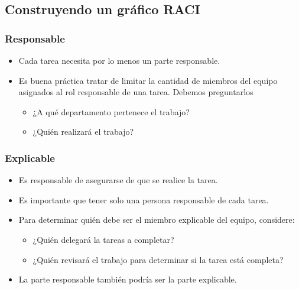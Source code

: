 \documentclass[10pt]{book}
\begin{document}
	\subsection{Construyendo un gráfico RACI}

	    \subsubsection{Responsable}

	    \begin{itemize}
		\item Cada tarea necesita por lo menos un parte responsable.
		\item Es buena práctica tratar de limitar la cantidad de miembros del equipo asignados al rol responsable de una tarea. Debemos preguntarlos 
		\begin{itemize}
		    \item ¿A qué departamento pertenece el trabajo?
		    \item ¿Quién realizará el trabajo?
		\end{itemize}
	    \end{itemize}
	
	    \subsubsection{Explicable}
	    \begin{itemize}
		\item Es responsable de asegurarse de que se realice la tarea.
		\item Es importante que tener solo una persona responsable de cada tarea.
		\item Para determinar quién debe ser el miembro explicable del equipo, considere:
		\begin{itemize}
		    \item ¿Quién delegará la tareas a completar?
		    \item ¿Quién revisará el trabajo para determinar si la tarea está completa?
		\end{itemize}
		\item La parte responsable también podría ser la parte explicable.
	    \end{itemize}
\end{document}
